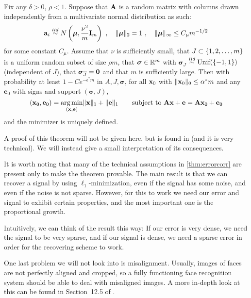 \begin{theorem}
	\label{thm:errorcorr}
	Fix any $ \delta>0 $, $ \rho<1 $. Suppose that $ \mathbf{A} $ is a random matrix with columns drawn independently from a multivariate normal distribution as such:
	\[
		\mathbf{a}_{i} \stackrel{iid}{\sim} N\left(\boldsymbol{\mu}, \frac{\nu^{2}}{m}\mathbf{I}_{m}\right)~, \quad \lVert\boldsymbol{\mu}\rVert_{2} = 1~, \quad \lVert\boldsymbol{\mu}\rVert_{\infty} \leq C_{\mu}m^{-1/2}
	\]
	for some constant $ C_{\mu} $. Assume that $ \nu $ is sufficiently small, that $ J \subset \{1, 2, \ldots, m\} $ is a uniform random subset of size $ \rho m $, that $ \boldsymbol{\sigma} \in \mathbb{R}^{m} $ with $ \boldsymbol{\sigma}_{J} $ $ \stackrel{iid}{\sim} \text{Unif}(\{-1, 1\}) $ (independent of $ J $), that $ \boldsymbol{\sigma}_{\overline{J}} = \mathbf{0} $ and that $ m $ is sufficiently large. Then with probability at least $ 1 - C e^{-\epsilon^{*}m} $ in $ A, J, \boldsymbol{\sigma} $, for all $ \mathbf{x}_{0} $ with $ \lVert\mathbf{x}_{0}\rVert_{0} \leq \alpha^{*}m $ and any $ \mathbf{e}_{0} $ with signs and support $ (\boldsymbol{\sigma}, J) $, 
	\begin{equation}
		\label{eq:errorcorr}
		(\mathbf{x}_{0}, \mathbf{e}_{0}) = \operatorname*{arg\,min}_{(\mathbf{x},\mathbf{e})} \lVert\mathbf{x}\rVert_{1} + \lVert\mathbf{e}\rVert_{1} \quad\quad\text{subject to}~ \mathbf{A}\mathbf{x} + \mathbf{e} = \mathbf{A}\mathbf{x}_{0} + \mathbf{e}_{0}
	\end{equation}
	and the minimizer is uniquely defined.
\end{theorem}

A proof of this theorem will not be given here, but is found in \cite{wright10dense} (and it is very technical). We will instead give a small interpretation of its consequences. 

It is worth noting that many of the technical assumptions in \cref{thm:errorcorr} are present only to make the theorem provable. The main result is that we can recover a signal by using $ \ell_{1} $-minimization, even if the signal has some noise, and even if the noise is not sparse. However, for this to work we need our error and signal to exhibit certain properties, and the most important one is the proportional growth. 

Intuitively, we can think of the result this way: If our error is very dense, we need the signal to be very sparse, and if our signal is dense, we need a sparse error in order for the recovering scheme to work. 

One last problem we will not look into is misalignment. Usually, images of faces are not perfectly aligned and cropped, so a fully functioning face recognition system should be able to deal with misaligned images. A more in-depth look at this can be found in Section~12.5 of \cite{eldar12theoryapplic}.









